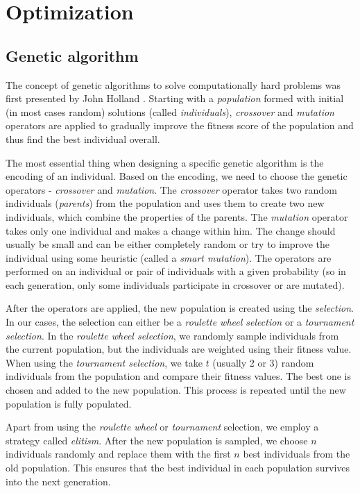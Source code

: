 \chapter{Optimization}

\section{Genetic algorithm}

The concept of genetic algorithms to solve computationally hard problems was first presented by John Holland \cite{Holland:1975}. Starting with a \textit{population} formed with initial (in most cases random) solutions (called \textit{individuals}), \textit{crossover} and \textit{mutation} operators are applied to gradually improve the fitness score of the population and thus find the best individual overall.

The most essential thing when designing a specific genetic algorithm is the encoding of an individual. Based on the encoding, we need to choose the genetic operators - \textit{crossover} and \textit{mutation}. The \textit{crossover} operator takes two random individuals (\textit{parents}) from the population and uses them to create two new individuals, which combine the properties of the parents. The \textit{mutation} operator takes only one individual and makes a change within him. The change should usually be small and can be either completely random or try to improve the individual using some heuristic (called a \textit{smart mutation}). The operators are performed on an individual or pair of individuals with a given probability (so in each generation, only some individuals participate in crossover or are mutated).

After the operators are applied, the new population is created using the \textit{selection}. In our cases, the selection can either be a \textit{roulette wheel selection} or a \textit{tournament selection}. In the \textit{roulette wheel selection}, we randomly sample individuals from the current population, but the individuals are weighted using their fitness value. When using the \textit{tournament selection}, we take $t$ (usually 2 or 3) random individuals from the population and compare their fitness values. The best one is chosen and added to the new population. This process is repeated until the new population is fully populated.

Apart from using the \textit{roulette wheel} or \textit{tournament} selection, we employ a strategy called \textit{elitism}. After the new population is sampled, we choose $n$ individuals randomly and replace them with the first $n$ best individuals from the old population. This ensures that the best individual in each population survives into the next generation.

